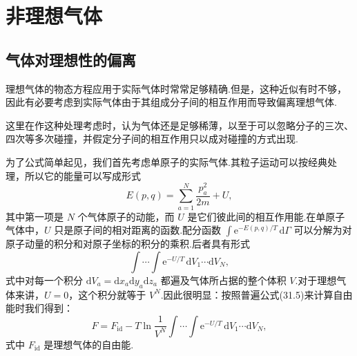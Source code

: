%
\chapter{非理想气体}

\section{气体对理想性的偏离}

理想气体的物态方程应用于实际气体时常常足够精确.但是，这种近似有时不够，因此有必要考虑到实际气体由于其组成分子间的相互作用而导致偏离理想气体.

这里在作这种处理考虑时，认为气体还是足够稀薄，以至于可以忽略分子的三次、四次等多次碰撞，并假定分子间的相互作用只以成对碰撞的方式出现.

为了公式简单起见，我们首先考虑单原子的实际气体.其粒子运动可以按经典处理，所以它的能量可以写成形式
\begin{equation}
  E(p,q)=\sum_{a=1}^{N}\frac{p_a^2}{2m}+U,
\end{equation}
其中第一项是 $N$ 个气体原子的动能，而 $U$ 是它们彼此间的相互作用能.在单原子气体中，$U$ 只是原子间的相对距离的函数.配分函数 $\int\mathrm{e}^{-E(p,q)/T}\,\mathrm{d}\varGamma$ 可以分解为对原子动量的积分和对原子坐标的积分的乘积.后者具有形式
\begin{equation*}
  \int\cdots\int\mathrm{e}^{-U/T}\,\mathrm{d}V_1\cdots\mathrm{d}V_N,
\end{equation*}
式中对每一个积分 $\mathrm{d}V_a=\mathrm{d}x_a\mathrm{d}y_a\mathrm{d}z_a$ 都遍及气体所占据的整个体积 $V$.对于理想气体来讲，$U=0$，这个积分就等于 $V^N$.因此很明显：按照普遍公式(31.5)来计算自由能时我们得到：
\begin{equation}
  F=F_{\mathrm{id}}-T\ln\frac{1}{V^N}\int\cdots\int\mathrm{e}^{-U/T}\,\mathrm{d}V_1\cdots\mathrm{d}V_N,
\end{equation}
式中 $F_{\mathrm{id}}$ 是理想气体的自由能.

